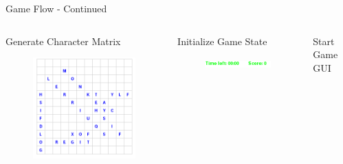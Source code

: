 \documentclass{beamer}
\begin{document}
\begin{frame}{Game Flow - Continued}
\begin{columns}[c]

\begin{column}{3cm}
\begin{tcolorbox}[colback=blue!5,colframe=blue!50!black,title=4]
\centering Generate Character Matrix
\end{tcolorbox}
\pause
\begin{figure}
\includegraphics[scale=0.3]{char_mat2.png}
\end{figure}
\end{column}
\pause
\begin{column}[b]{4cm}
\begin{tcolorbox}[colback=blue!5,colframe=blue!50!black,title=5]
\centering Initialize Game State
\end{tcolorbox}
\pause
\begin{figure}
\includegraphics[scale=0.5]{game_status.png}
\end{figure}
\end{column}
\pause
\begin{column}{3cm}
\begin{tcolorbox}[colback=blue!5,colframe=blue!50!black,title=6]
\centering Start Game GUI
\end{tcolorbox}
\pause
\begin{figure}

\end{figure}
\end{column}
\end{columns}
\end{frame}
\end{document}
